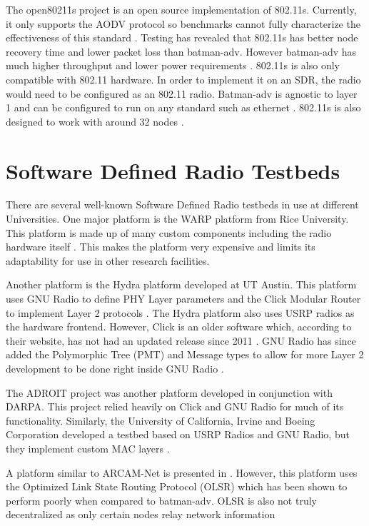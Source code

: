 The open80211s project is an open source implementation of 802.11s. Currently, it only supports the AODV protocol so benchmarks cannot fully characterize the effectiveness of this standard \cite{5483777}. Testing has revealed that 802.11s has better node recovery time and lower packet loss than batman-adv. However batman-adv has much higher throughput and lower power requirements \cite{5483777} \cite{6379142}. 802.11s is also only compatible with 802.11 hardware. In order to implement it on an SDR, the radio would need to be configured as an 802.11 radio. Batman-adv is agnostic to layer 1 and can be configured to run on any standard such as ethernet \cite{5483777}. 802.11s is also designed to work with around 32 nodes \cite{ieee802tut}. 


\section{Software Defined Radio Testbeds}

There are several well-known Software Defined Radio testbeds in use at different Universities. One major platform is the WARP platform from Rice University. This platform is made up of many custom components including the radio hardware itself \cite{7071706}. This makes the platform very expensive and limits its adaptability for use in other research facilities. 

Another platform is the Hydra platform developed at UT Austin. This platform uses GNU Radio to define PHY Layer parameters and the Click Modular Router to implement Layer 2 protocols \cite{4212821}. The Hydra platform also uses USRP radios as the hardware frontend. However, Click is an older software which, according to their website, has not had an updated release since 2011 \cite{0009}. GNU Radio has since added the Polymorphic Tree (PMT) and Message types to allow for more Layer 2 development to be done right inside GNU Radio \cite{0010}. 

The ADROIT project was another platform developed in conjunction with DARPA. This project relied heavily on Click and GNU Radio for much of its functionality. \cite{4286321}  Similarly, the University of California, Irvine and Boeing Corporation developed a testbed based on USRP Radios and GNU Radio, but they implement custom MAC layers \cite{4753441}. 

A platform similar to ARCAM-Net is presented in \cite{0002}. However, this platform uses the Optimized Link State Routing Protocol (OLSR) which has been shown to perform poorly when compared to batman-adv. OLSR is also not truly decentralized as only certain nodes relay network information \cite{5375690}
  
